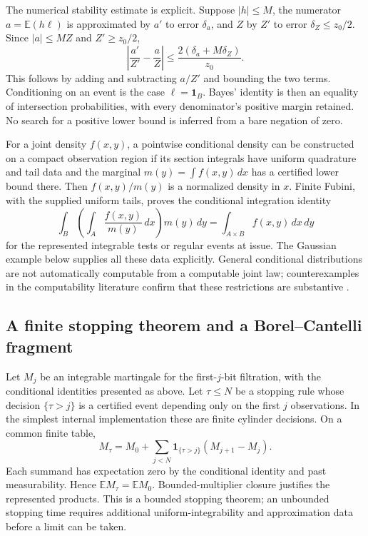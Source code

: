 The numerical stability estimate is explicit. Suppose $|h|\le M$, the
numerator $a=\mathbb E(h\ell)$ is approximated by $a'$ to error
$\delta_a$, and $Z$ by $Z'$ to error $\delta_Z\le z_0/2$. Since
$|a|\le MZ$ and $Z'\ge z_0/2$,
\begin{equation}\label{eq:bayes-budget}
 \left|\frac{a'}{Z'}-\frac aZ\right|
 \le\frac{2(\delta_a+M\delta_Z)}{z_0}.
\end{equation}
This follows by adding and subtracting $a/Z'$ and bounding the two terms.
Conditioning on an event is the case $\ell=\mathbf1_B$. Bayes' identity is
then an equality of intersection probabilities, with every denominator's
positive margin retained. No search for a positive lower bound is inferred
from a bare negation of zero.

For a joint density $f(x,y)$, a pointwise conditional density can be
constructed on a compact observation region if its section integrals have
uniform quadrature and tail data and the marginal
$m(y)=\int f(x,y)\,dx$ has a certified lower bound there. Then
$f(x,y)/m(y)$ is a normalized density in $x$. Finite Fubini, with the
supplied uniform tails, proves the conditional integration identity
\[
 \int_B\left(\int_A\frac{f(x,y)}{m(y)}\,dx\right)m(y)\,dy
   =\int_{A\times B}f(x,y)\,dx\,dy
\]
for the represented integrable tests or regular events at issue. The
Gaussian example below supplies all these data explicitly. General
conditional distributions are not automatically computable from a computable
joint law; counterexamples in the computability literature confirm that
these restrictions are substantive \cite{ackerman}.

\subsection{A finite stopping theorem and a Borel--Cantelli fragment}

Let $M_j$ be an integrable martingale for the first-$j$-bit filtration, with
the conditional identities presented as above. Let $\tau\le N$ be a
stopping rule whose decision $\{\tau>j\}$ is a certified event depending
only on the first $j$ observations. In the simplest internal implementation
these are finite cylinder decisions. On a common finite table,
\[
 M_\tau=M_0+\sum_{j<N}\mathbf1_{\{\tau>j\}}(M_{j+1}-M_j).
\]
Each summand has expectation zero by the conditional identity and past
measurability. Hence $\mathbb E M_\tau=\mathbb E M_0$. Bounded-multiplier
closure justifies the represented products. This is a bounded stopping
theorem; an unbounded stopping time requires additional uniform-integrability
and approximation data before a limit can be taken.

